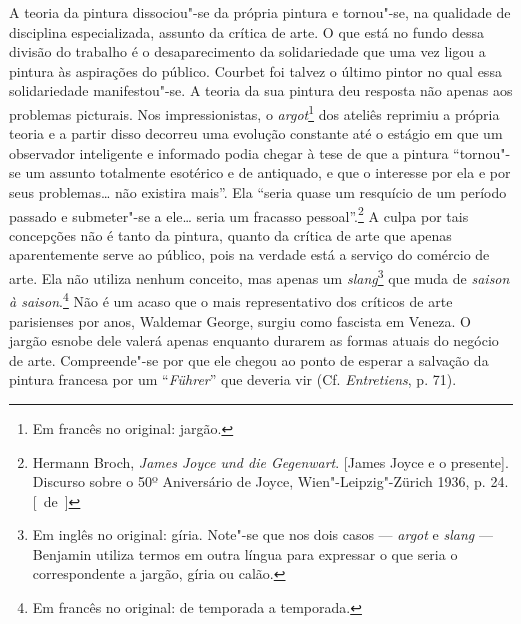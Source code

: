 A teoria da pintura dissociou"-se da própria pintura e tornou"-se, na
qualidade de disciplina especializada, assunto da crítica de arte. O que
está no fundo dessa divisão do trabalho é o desaparecimento da
solidariedade que uma vez ligou a pintura às aspirações do público.
Courbet foi talvez o último pintor no qual essa solidariedade
manifestou"-se. A teoria da sua pintura deu resposta não apenas aos
problemas picturais. Nos impressionistas, o \emph{argot}\footnote{Em francês no original: jargão. \versal{[N.~T.]}} dos ateliês reprimiu a própria teoria
e a partir disso decorreu uma evolução constante até o
estágio em que um observador inteligente e informado podia chegar à tese
de que a pintura ``tornou"-se um assunto totalmente esotérico e
de antiquado, e que o interesse por ela e por seus problemas\ldots{} não
existira mais''. Ela ``seria quase um resquício de um período passado e
submeter"-se a ele\ldots{} seria um fracasso pessoal''.\footnote{Hermann Broch, \emph{James
  Joyce und die Gegenwart}. {[}James Joyce e o presente{]}. Discurso
  sobre o 50º Aniversário de Joyce, Wien"-Leipzig"-Zürich 1936, p. 24. [~de~]} A
culpa por tais concepções não é tanto da pintura, quanto da crítica de
arte que apenas aparentemente serve ao público, pois na verdade está a
serviço do comércio de arte. Ela não utiliza nenhum conceito, mas apenas
um \emph{slang}\footnote{Em inglês no original: gíria. Note"-se que
  nos dois casos --- \emph{argot} e \emph{slang} --- Benjamin utiliza termos em
  outra língua para expressar o que seria o correspondente a jargão,
  gíria ou calão. \versal{[N.~T.]}} que muda de \emph{saison à saison}.\footnote{Em francês no original: de temporada a temporada. \versal{[N.~T.]}} Não é um acaso que
o mais representativo dos críticos de arte parisienses por anos,
Waldemar George, surgiu como fascista em Veneza. O jargão esnobe dele
valerá apenas enquanto durarem as formas atuais do negócio de arte.
Compreende"-se por que ele chegou ao ponto de esperar a salvação da
pintura francesa por um ``\emph{Führer}'' que deveria vir (Cf.
\emph{Entretiens}, p. 71).

